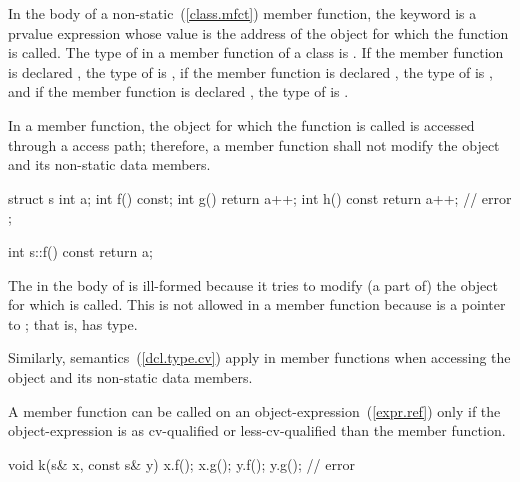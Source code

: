 \pnum
{}%
In the body of a non-static~(\ref{class.mfct}) member function, the
keyword  is a prvalue expression whose value is the
address of the object for which the function is called.
%
The type of  in a member function of a class  is
.
%
If the member function is declared , the type of
 is  ,
%
if the member function is declared , the type of
 is  , and if the member function
is declared  , the type of  is
  .

\pnum
{}%
In a  member function, the object for which the function is
called is accessed through a  access path; therefore, a
 member function shall not modify the object and its
non-static data members.
\enterexample

\begin{codeblock}
struct s {
  int a;
  int f() const;
  int g() { return a++; }
  int h() const { return a++; } // error
};

int s::f() const { return a; }
\end{codeblock}

The  in the body of  is ill-formed because it
tries to modify (a part of) the object for which  is
called. This is not allowed in a  member function because
 is a pointer to ; that is,  has
 type.
\exitexample

\pnum
Similarly,  semantics~(\ref{dcl.type.cv}) apply in
 member functions when accessing the object and its
non-static data members.

\pnum
A  member function can be called on an
object-expression~(\ref{expr.ref}) only if the object-expression is as
cv-qualified or less-cv-qualified than the member function.
\enterexample

\begin{codeblock}
void k(s& x, const s& y) {
  x.f();
  x.g();
  y.f();
  y.g();                        // error
}
\end{codeblock}

